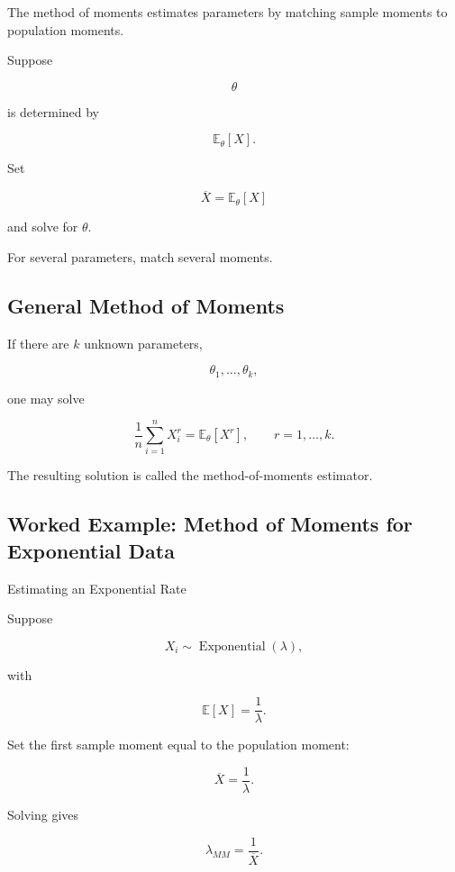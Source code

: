 The method of moments estimates parameters by matching sample moments to
population moments.

Suppose

\[
\theta
\]

is determined by

\[
\mathbb{E}_\theta[X].
\]

Set

\[
\boxed{
\overline{X}
=
\mathbb{E}_\theta[X]
}
\]

and solve for \(\theta\).

For several parameters, match several moments.

\subsection{General Method of Moments}
\label{subsec:general-method-moments}

If there are \(k\) unknown parameters,

\[
\theta_1,\ldots,\theta_k,
\]

one may solve

\[
\boxed{
\frac1n
\sum_{i=1}^{n}
X_i^r
=
\mathbb{E}_\theta[X^r],
\qquad
r=1,\ldots,k.
}
\]

The resulting solution is called the method-of-moments estimator.

\subsection{Worked Example: Method of Moments for Exponential Data}
\label{subsec:worked-mom-exponential}

\begin{workedexamplebox}{Estimating an Exponential Rate}

Suppose

\[
X_i
\sim
\operatorname{Exponential}(\lambda),
\]

with

\[
\mathbb{E}[X]
=
\frac1\lambda.
\]

Set the first sample moment equal to the population moment:

\[
\overline{X}
=
\frac1\lambda.
\]

Solving gives

\begin{answerbox}
\[
\boxed{
\widehat{\lambda}_{MM}
=
\frac1{\overline{X}}.
}
\]
\end{answerbox}

\end{workedexamplebox}

